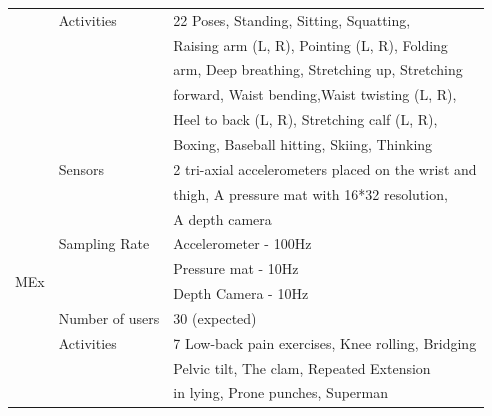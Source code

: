 \documentclass[runningheads]{llncs}
\begin{document}
\begin{table}
\begin{tabular}{@{\hspace{5pt}}l@{\hspace{15pt}}l@{\hspace{15pt}}l@{\hspace{5pt}}}
&Activities&22 Poses, Standing, Sitting, Squatting,\\
&&Raising arm (L, R), Pointing (L, R), Folding\\
&&arm, Deep breathing, Stretching up, Stretching\\
&&forward, Waist bending,Waist twisting (L, R), \\
&&Heel to back (L, R), Stretching calf (L, R),\\
&&Boxing, Baseball hitting, Skiing, Thinking\\
\hline
\multirow{10}{*}{MEx}&Sensors&2 tri-axial accelerometers placed on the wrist and\\
&&thigh, A pressure mat with 16*32 resolution,\\
&&A depth camera\\
&Sampling Rate&Accelerometer - 100Hz\\
&& Pressure mat - 10Hz\\
&& Depth Camera - 10Hz\\
&Number of users&30 (expected)\\
&Activities&7 Low-back pain exercises, Knee rolling, Bridging\\
&&Pelvic tilt, The clam, Repeated Extension\\ 
&&in lying, Prone punches, Superman\\
\hline
\end{tabular}
\end{table}
\end{document}
